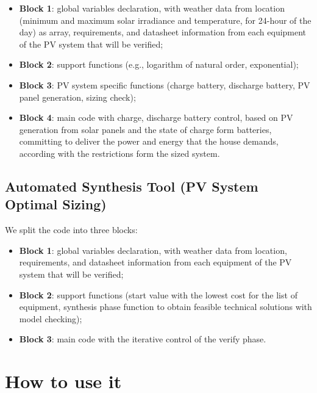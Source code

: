 \begin{itemize}
\item \textbf{Block 1}: global variables declaration, with weather data from location (minimum and maximum solar irradiance and temperature, for 24-hour of the day) as array, requirements, and datasheet information from each equipment of the PV system that will be verified; 

\item \textbf{Block 2}: support functions (e.g., logarithm of natural order, exponential);

\item \textbf{Block 3}: PV system specific functions (charge battery, discharge battery, PV panel generation, sizing check);

\item \textbf{Block 4}: main code with charge, discharge battery control, based on PV generation from solar panels and the state of charge form batteries, committing to deliver the power and energy that the house demands, according with the restrictions form the sized system.
\end{itemize}

\subsection{Automated Synthesis Tool (PV System Optimal Sizing)}
\label{sec:automatedsynthesis}

We split the code into three blocks:

\begin{itemize}
\item \textbf{Block 1}: global variables declaration, with weather data from location, requirements, and datasheet information from each equipment of the PV system that will be verified; 

\item \textbf{Block 2}: support functions (start value with the lowest cost for the list of equipment, synthesis phase function to obtain feasible technical solutions with model checking);

\item \textbf{Block 3}: main code with the iterative control of the verify phase.
\end{itemize}


\section{How to use it}

